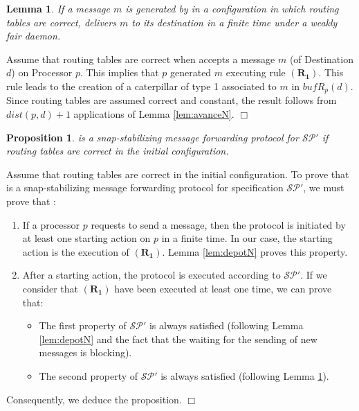 \documentclass[11pt]{article}
\newtheorem{lemma}{Lemma}
\newtheorem{proposition}{Proposition}
\newenvironment{proof}{{\noindent\bf Proof. } }{{\hfill $\Box$}}
\begin{document}
\begin{lemma} \label{lem:transportN}
If a message $m$ is generated by \AN in a configuration in which routing tables are correct, \AN delivers $m$ to its destination in a finite time under a weakly fair daemon.
\end{lemma}

\begin{proof}
Assume that routing tables are correct when \AN accepts a message $m$ (of Destination $d$) on Processor $p$. This implies that $p$ generated $m$ executing rule $\boldsymbol{(R_{1})}$. This rule leads to the creation of a caterpillar of type 1 associated to $m$ in $bufR_{p}(d)$. Since routing tables are assumed correct and constant, the result follows from $dist(p,d)+1$ applications of Lemma \ref{lem:avanceN}.
\end{proof}

\begin{proposition} \label{prop:snapTRN}
\AN is a snap-stabilizing message forwarding protocol for $\mathcal{SP}'$ if routing tables are correct in the initial configuration.
\end{proposition}

\begin{proof}
Assume that routing tables are correct in the initial configuration. To prove that \AN is a snap-stabilizing message forwarding protocol for specification $\mathcal{SP}'$, we must prove that :

\begin{enumerate}
\item If a processor $p$ requests to send a message, then the protocol is initiated by at least one starting action on $p$ in a finite time. In our case, the starting action is the execution of $\boldsymbol{(R_{1})}$. Lemma \ref{lem:depotN} proves this property. 
\item After a starting action, the protocol is executed according to $\mathcal{SP}'$. If we consider that $\boldsymbol{(R_{1})}$ have been executed at least one time, we can prove that:

\begin{itemize}
\item The first property of $\mathcal{SP}'$ is always satisfied (following Lemma \ref{lem:depotN} and the fact that the waiting for the sending of new messages is blocking). 
\item The second property of $\mathcal{SP}'$ is always satisfied (following Lemma \ref{lem:transportN}). 
\end{itemize}

\end{enumerate}

Consequently, we deduce the proposition.
\end{proof}
\end{document}

